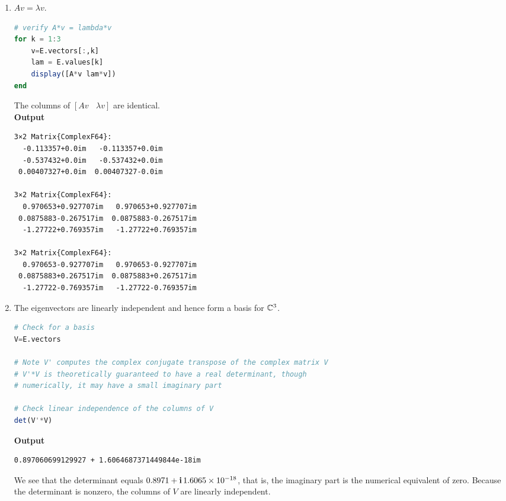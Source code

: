 \begin{enumerate}
 \item $Av = \lambda v$. \\
   

\begin{lstlisting}[language=Julia,style=mystyle]
# verify A*v = lambda*v
for k = 1:3
    v=E.vectors[:,k]
    lam = E.values[k]
    display([A*v lam*v])
end
\end{lstlisting}
The columns of $\left[ Av~~~~\lambda v\right]$ are identical.\\

\textbf{Output} 
\begin{verbatim}
3×2 Matrix{ComplexF64}:
  -0.113357+0.0im   -0.113357+0.0im
  -0.537432+0.0im   -0.537432+0.0im
 0.00407327+0.0im  0.00407327-0.0im
 
3×2 Matrix{ComplexF64}:
  0.970653+0.927707im   0.970653+0.927707im
 0.0875883-0.267517im  0.0875883-0.267517im
  -1.27722+0.769357im   -1.27722+0.769357im
  
3×2 Matrix{ComplexF64}:
  0.970653-0.927707im   0.970653-0.927707im
 0.0875883+0.267517im  0.0875883+0.267517im
  -1.27722-0.769357im   -1.27722-0.769357im
\end{verbatim}

 \item The eigenvectors are linearly independent and hence form a basis for $\mathbb C^3$.
\begin{lstlisting}[language=Julia,style=mystyle]
# Check for a basis
V=E.vectors

# Note V' computes the complex conjugate transpose of the complex matrix V
# V'*V is theoretically guaranteed to have a real determinant, though
# numerically, it may have a small imaginary part

# Check linear independence of the columns of V
det(V'*V)
\end{lstlisting}
\textbf{Output} 
\begin{verbatim}
0.897060699129927 + 1.6064687371449844e-18im
\end{verbatim}

We see that the determinant equals $0.8971 + \mathop{\bm{\mathrm i}} 1.6065 \times 10^{-18}$, that is, the imaginary part is the numerical equivalent of zero. Because the determinant is nonzero, the columns of $V$ are linearly independent. \\


\end{enumerate}

